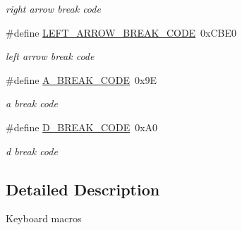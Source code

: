 \begin{DoxyCompactItemize}
\begin{DoxyCompactList}\small\item\em right arrow break code \end{DoxyCompactList}\item 
\mbox{\label{group__keyboard__macros_gad7e318af05b90ab67821d521b916fe72}} 
\#define \hyperlink{group__keyboard__macros_gad7e318af05b90ab67821d521b916fe72}{L\+E\+F\+T\+\_\+\+A\+R\+R\+O\+W\+\_\+\+B\+R\+E\+A\+K\+\_\+\+C\+O\+DE}~0x\+C\+B\+E0
\begin{DoxyCompactList}\small\item\em left arrow break code \end{DoxyCompactList}\item 
\mbox{\label{group__keyboard__macros_ga6b3bc710b60263bd76130540a24b74b6}} 
\#define \hyperlink{group__keyboard__macros_ga6b3bc710b60263bd76130540a24b74b6}{A\+\_\+\+B\+R\+E\+A\+K\+\_\+\+C\+O\+DE}~0x9E
\begin{DoxyCompactList}\small\item\em a break code \end{DoxyCompactList}\item 
\mbox{\label{group__keyboard__macros_gaeb7fb0b62eabc29ca24eb9ce77b07152}} 
\#define \hyperlink{group__keyboard__macros_gaeb7fb0b62eabc29ca24eb9ce77b07152}{D\+\_\+\+B\+R\+E\+A\+K\+\_\+\+C\+O\+DE}~0x\+A0
\begin{DoxyCompactList}\small\item\em d break code \end{DoxyCompactList}\end{DoxyCompactItemize}


\subsection{Detailed Description}
Keyboard macros 